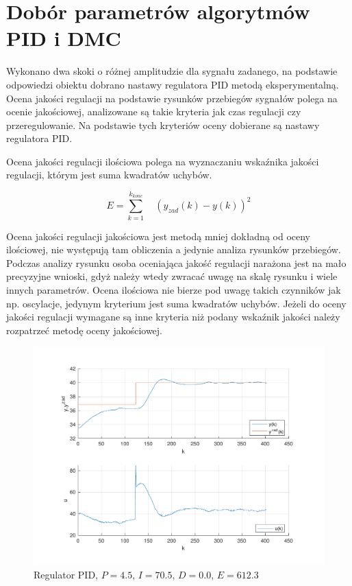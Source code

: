 \section{Dobór parametrów algorytmów PID i DMC}
Wykonano dwa skoki o różnej amplitudzie dla sygnału zadanego, 
na podstawie odpowiedzi obiektu dobrano nastawy regulatora PID metodą eksperymentalną. 
Ocena jakości regulacji na podstawie rysunków przebiegów sygnałów polega na ocenie jakościowej, 
analizowane są takie kryteria jak czas regulacji czy przeregulowanie. 
Na podstawie tych kryteriów oceny dobierane są nastawy regulatora PID.

Ocena jakości regulacji ilościowa polega na wyznaczaniu wskaźnika jakości regulacji, 
którym jest suma kwadratów uchybów. 

$$
E=\sum_{k=1}^{k_{konc}} \quad (y_{zad}(k)-y(k))^{2}
$$

Ocena jakości regulacji jakościowa jest metodą mniej dokładną od oceny ilościowej, 
nie występują tam obliczenia a jedynie analiza rysunków przebiegów. 
Podczas analizy rysunku osoba oceniająca jakość regulacji narażona jest na mało precyzyjne wnioski, 
gdyż należy wtedy zwracać uwagę na skalę rysunku i wiele innych parametrów. 
Ocena ilościowa nie bierze pod uwagę takich czynników jak np. oscylacje, 
jedynym kryterium jest suma kwadratów uchybów. 
Jeżeli do oceny jakości regulacji wymagane są inne kryteria niż podany wskaźnik 
jakości należy rozpatrzeć metodę oceny jakościowej. 


\begin{figure}[H]
    \centering
    \includegraphics[scale=0.75]{../lab/zad_4/zad4pidd1.pdf}
    \caption{Regulator PID, $P=\num{4.5}$, $I=\num{70.5}$, $D=\num{0.0}$, $E=\num{612.3}$}
\end{figure}

